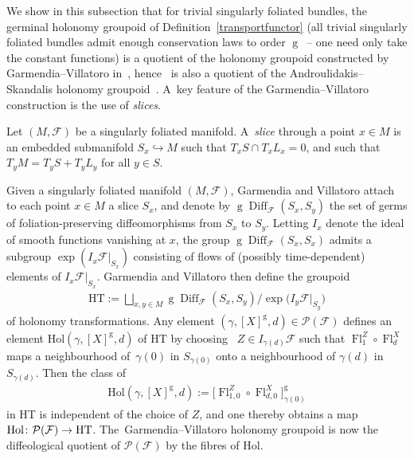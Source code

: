 \documentclass[10pt,a4paper]{amsart}
\numberwithin{equation}{section}
\def\g{\operatorname{g}}
\def\Diff{\operatorname{Diff}}
\def\Fl{\operatorname{Fl}}
\def\FF{{\mathcal{F}}}
\def\PP{{\mathcal{P}}}
\begin{document}
We show in this subsection that for trivial singularly foliated bundles, the germinal holonomy groupoid of Definition~\ref{transportfunctor} (all trivial singularly foliated bundles admit enough conservation laws to order $\g$~-- one need only take the constant functions) is a quotient of the holonomy groupoid constructed by Garmendia--Villatoro in~\cite{VilGar1}, hence~\cite[Theorem~5.5]{VilGar1} is also a quotient of the Androulidakis--Skandalis holonomy groupoid~\cite{iakovos2}. A~key feature of the Garmendia--Villatoro con\-st\-ruction is the use of \textit{slices}.

\begin{Definition}
Let $(M,\FF)$ be a singularly foliated manifold. A~\textit{slice} through a point $x\in M$ is an embedded submanifold $S_{x}\hookrightarrow M$ such that $T_{x}S\cap T_{x}L_{x} = 0$, and such that $T_{y}M = T_{y}S+T_{y}L_{y}$ for all $y\in S$.
\end{Definition}

Given a singularly foliated manifold $(M,\FF)$, Garmendia and Villatoro attach to each point $x\in M$ a slice $S_{x}$, and denote by $\g\Diff_{\FF}(S_{x},S_{y})$ the set of germs of foliation-preserving diffeomorphisms from $S_{x}$ to $S_{y}$. Letting $I_{x}$ denote the ideal of smooth functions vanishing at $x$, the group $\g\Diff_{\FF}(S_{x},S_{x})$ admits a subgroup $\exp(I_{x}\FF|_{S_{x}})$ consisting of flows of (possibly time-dependent) elements of $I_{x}\FF|_{S_{x}}$. Garmendia and Villatoro then define the groupoid
\begin{gather*}
\text{HT}:=\bigsqcup_{x,y\in M}\g\Diff_{\FF}(S_{x},S_{y})/\exp\big(I_{y}\FF|_{S_{y}}\big)
\end{gather*}
of holonomy transformations. Any element $(\gamma,[X]^{\g},d)\in\PP(\FF)$ defines an element $\text{Hol}(\gamma,[X]^{\g},d)$ of $\text{HT}$ by choosing~\cite[Lemma~A.8]{iakovos4} $Z\in I_{\gamma(d)}\FF$ such that $\Fl^{Z}_{1}\circ\Fl^{X}_{d}$ maps a neighbourhood of~$\gamma(0)$ in $S_{\gamma(0)}$ onto a neighbourhood of $\gamma(d)$ in $S_{\gamma(d)}$. Then the class of
\begin{gather*}
\text{Hol}(\gamma,[X]^{\g},d):=\big[\Fl^{Z}_{1,0}\circ\Fl^{X}_{d,0}\big]^{\g}_{\gamma(0)}
\end{gather*}
in HT is independent of the choice of $Z$, and one thereby obtains a map $\text{Hol}\colon \PP(\FF)\rightarrow {\rm HT}$. The~Garmendia--Villatoro holonomy groupoid is now the diffeological quotient of $\PP(\FF)$ by the fibres of $\text{Hol}$.
\end{document}
